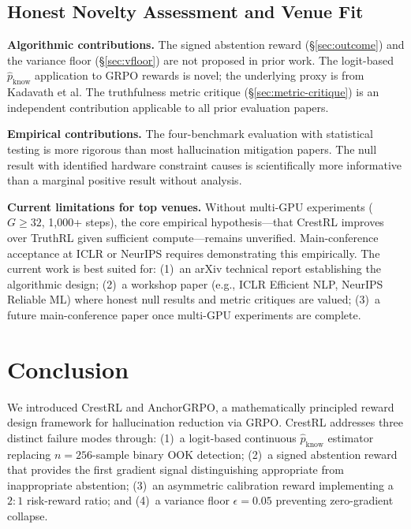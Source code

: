 \documentclass[11pt]{article}
\begin{document}
\subsection{Honest Novelty Assessment and Venue Fit}
\label{sec:novelty}

\textbf{Algorithmic contributions.} The signed abstention reward (\S\ref{sec:outcome}) and the variance floor (\S\ref{sec:vfloor}) are not proposed in prior work. The logit-based $\hat{p}_{\text{know}}$ application to GRPO rewards is novel; the underlying proxy is from Kadavath et al. The truthfulness metric critique (\S\ref{sec:metric-critique}) is an independent contribution applicable to all prior evaluation papers.

\textbf{Empirical contributions.} The four-benchmark evaluation with statistical testing is more rigorous than most hallucination mitigation papers. The null result with identified hardware constraint causes is scientifically more informative than a marginal positive result without analysis.

\textbf{Current limitations for top venues.} Without multi-GPU experiments ($G\geq32$, 1{,}000+ steps), the core empirical hypothesis---that CrestRL improves over TruthRL given sufficient compute---remains unverified. Main-conference acceptance at ICLR or NeurIPS requires demonstrating this empirically. The current work is best suited for: (1)~an arXiv technical report establishing the algorithmic design; (2)~a workshop paper (e.g., ICLR Efficient NLP, NeurIPS Reliable ML) where honest null results and metric critiques are valued; (3)~a future main-conference paper once multi-GPU experiments are complete.

\section{Conclusion}
\label{sec:conclusion}

We introduced CrestRL and AnchorGRPO, a mathematically principled reward design framework for hallucination reduction via GRPO. CrestRL addresses three distinct failure modes through: (1)~a logit-based continuous $\hat{p}_{\text{know}}$ estimator replacing $n=256$-sample binary OOK detection; (2)~a signed abstention reward that provides the first gradient signal distinguishing appropriate from inappropriate abstention; (3)~an asymmetric calibration reward implementing a $2{:}1$ risk-reward ratio; and (4)~a variance floor $\epsilon=0.05$ preventing zero-gradient collapse.
\end{document}
